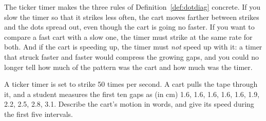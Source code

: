 The ticker timer makes the three rules of Definition~\ref{def:dotdiag} concrete. If you slow the timer so that it strikes less often, the cart moves farther between strikes and the dots spread out, even though the cart is going no faster. If you want to compare a fast cart with a slow one, the timer must strike at the same rate for both. And if the cart is speeding up, the timer must \emph{not} speed up with it: a timer that struck faster and faster would compress the growing gaps, and you could no longer tell how much of the pattern was the cart and how much was the timer.

\begin{checkbox}
A ticker timer is set to strike \num{50} times per second. A cart pulls the tape through it, and a student measures the first ten gaps as (in \si{\centi\metre}) 1.6, 1.6, 1.6, 1.6, 1.6, 1.9, 2.2, 2.5, 2.8, 3.1. Describe the cart's motion in words, and give its speed during the first five intervals.
\end{checkbox}
